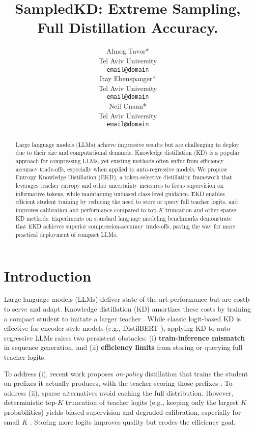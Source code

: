 \documentclass[11pt]{article}
\title{SampledKD: Extreme Sampling, Full Distillation Accuracy.}
\author{Almog Tavor*\\
  Tel Aviv University \\
  \texttt{email@domain} \\\And
  Itay Ebenspanger*\\
  Tel Aviv University \\
  \texttt{email@domain} \\\And
  Neil Cnaan*\\
  Tel Aviv University \\
  \texttt{email@domain} \\
  }
\begin{document}
\maketitle
\let\thefootnote\relax
\footnotemark
{}
\begin{abstract}
Large language models (LLMs) achieve impressive results but are challenging to deploy due to their size and computational demands. Knowledge distillation (KD) is a popular approach for compressing LLMs, yet existing methods often suffer from efficiency-accuracy trade-offs, especially when applied to auto-regressive models. We propose Entropy Knowledge Distillation (EKD), a token-selective distillation framework that leverages teacher entropy and other uncertainty measures to focus supervision on informative tokens, while maintaining unbiased class-level guidance. EKD enables efficient student training by reducing the need to store or query full teacher logits, and improves calibration and performance compared to top-$K$ truncation and other sparse KD methods. Experiments on standard language modeling benchmarks demonstrate that EKD achieves superior compression-accuracy trade-offs, paving the way for more practical deployment of compact LLMs.
\end{abstract}

\section{Introduction}

Large language models (LLMs) deliver state-of-the-art performance but are costly to serve and adapt. Knowledge distillation (KD) amortizes these costs by training a compact student to imitate a larger teacher \citep{hinton2015distillation}. While classic logit-based KD is effective for encoder-style models (e.g., DistilBERT \citep{sanh2019distilbert}), applying KD to auto-regressive LLMs raises two persistent obstacles: (i) \textbf{train-inference mismatch} in sequence generation, and (ii) \textbf{efficiency limits} from storing or querying full teacher logits.

To address (i), recent work proposes \emph{on-policy} distillation that trains the student on prefixes it actually produces, with the teacher scoring those prefixes \citep{agarwal2024gkd}. To address (ii), sparse alternatives avoid caching the full distribution. However, deterministic top-$K$ truncation of teacher logits (e.g., keeping only the largest $K$ probabilities) yields biased supervision and degraded calibration, especially for small $K$ \citep{anshumann2025sparse,shum2024first}. Storing more logits improves quality but erodes the efficiency goal.
\end{document}
